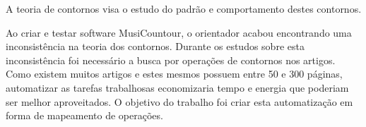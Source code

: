 \documentclass[11pt]{article}
\begin{document}
A teoria de contornos visa o estudo do padrão e comportamento destes contornos.






Ao criar e testar software MusiCountour, o orientador acabou
encontrando uma inconsistência na teoria dos contornos.
Durante os estudos sobre esta inconsistência foi necessário a busca
por operações de contornos nos artigos.
Como existem muitos artigos e estes mesmos possuem entre 50 e 300
páginas, automatizar as tarefas trabalhosas economizaria tempo e
energia que poderiam ser melhor aproveitados.
O objetivo do trabalho foi criar esta automatização em forma de
mapeamento de operações.

\label{sec:materiais}
\end{document}
